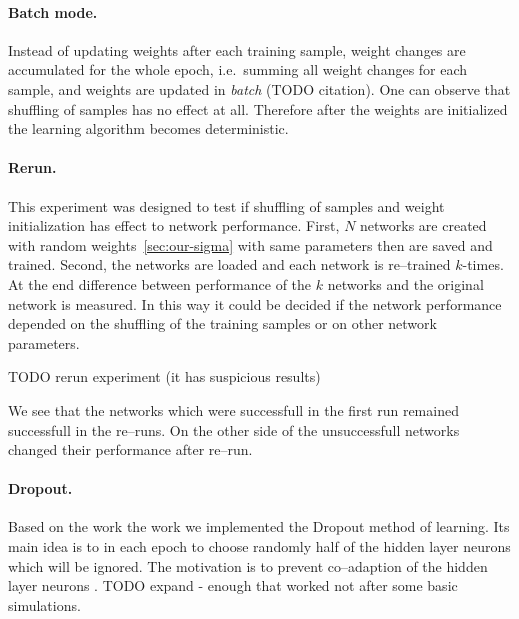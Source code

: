 \paragraph{Batch mode.} Instead of updating weights after each training sample, weight changes are accumulated for the whole epoch, i.e.~summing all weight changes for each sample, and weights are updated in \emph{batch} (TODO citation). One can observe that shuffling of samples has no effect at all. Therefore after the weights are initialized the learning algorithm becomes deterministic.

\paragraph{Rerun.} This experiment was designed to test if shuffling of samples and weight initialization has effect to network performance. First, $N$ networks are created with random weights~\ref{sec:our-sigma} with same parameters then are saved and trained. Second, the networks are loaded and each network is re--trained $k$-times. At the end difference between performance of the $k$ networks and the original network is measured. In this way it could be decided if the network performance depended on the shuffling of the training samples or on other network parameters. 

TODO rerun experiment (it has suspicious results) 



We see that the networks which were successfull in the first run remained successfull in the re--runs. On the other side of the unsuccessfull networks changed their performance after re--run. 

\paragraph{Dropout.}
Based on the work the work \citet{hinton2012improving} we implemented the Dropout method of learning. Its main idea is to in each epoch to choose randomly half of the hidden layer neurons which will be ignored. The motivation is to prevent co--adaption of the hidden layer neurons \citep{hinton2012improving}. 
TODO expand - enough that worked not after some basic simulations. 

